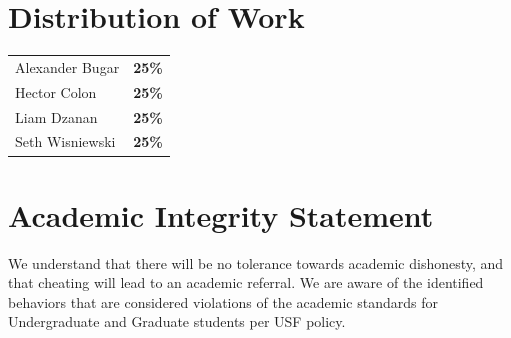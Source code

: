 \documentclass[11pt,letterpaper]{article}
\begin{document}
\section*{Distribution of Work}
\begin{tabular}{@{}ll@{}}
    Alexander Bugar & \textbf{25\%} \\
    Hector Colon & \textbf{25\%} \\
    Liam Dzanan & \textbf{25\%} \\
    Seth Wisniewski & \textbf{25\%}
\end{tabular}

\section*{Academic Integrity Statement}
We understand that there will be no tolerance towards academic dishonesty, and that cheating will lead to an academic referral. We are aware of the identified behaviors that are considered violations of the academic standards for Undergraduate and Graduate students per USF policy.
\end{document}
